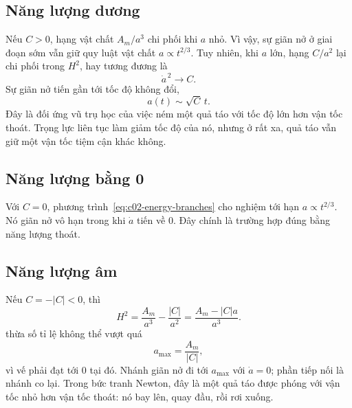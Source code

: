 \subsection{Năng lượng dương}

Nếu \(C>0\), hạng vật chất \(A_m/a^3\) chi phối khi \(a\) nhỏ. Vì vậy, sự giãn nở ở giai đoạn sớm vẫn giữ quy luật vật chất \(a\propto t^{2/3}\). Tuy nhiên, khi \(a\) lớn, hạng \(C/a^2\) lại chi phối trong \(H^2\), hay tương đương là
\begin{equation}
\dot a^{\,2}\longrightarrow C.
\end{equation}
Sự giãn nở tiến gần tới tốc độ không đổi,
\begin{equation}
a(t)\sim\sqrt C\,t.
\label{eq:c02-positive-late}
\end{equation}
Đây là đối ứng vũ trụ học của việc ném một quả táo với tốc độ lớn hơn vận tốc thoát. Trọng lực liên tục làm giảm tốc độ của nó, nhưng ở rất xa, quả táo vẫn giữ một vận tốc tiệm cận khác không.

\subsection{Năng lượng bằng 0}

Với \(C=0\), phương trình~\eqref{eq:c02-energy-branches} cho nghiệm tới hạn \(a\propto t^{2/3}\). Nó giãn nở vô hạn trong khi \(\dot a\) tiến về 0. Đây chính là trường hợp đúng bằng năng lượng thoát.

\subsection{Năng lượng âm}

Nếu \(C=-|C|<0\), thì
\begin{equation}
H^2=\frac{A_m}{a^3}-\frac{|C|}{a^2}
=\frac{A_m-|C|a}{a^3}.
\label{eq:c02-negative-energy}
\end{equation}
thừa số tỉ lệ không thể vượt quá
\begin{equation}
a_{\max}=\frac{A_m}{|C|},
\label{eq:c02-amax}
\end{equation}
vì vế phải đạt tới 0 tại đó. Nhánh giãn nở đi tới \(a_{\max}\) với \(\dot a=0\); phần tiếp nối là nhánh co lại. Trong bức tranh Newton, đây là một quả táo được phóng với vận tốc nhỏ hơn vận tốc thoát: nó bay lên, quay đầu, rồi rơi xuống.

\begin{classroomqa}
\end{classroomqa}

